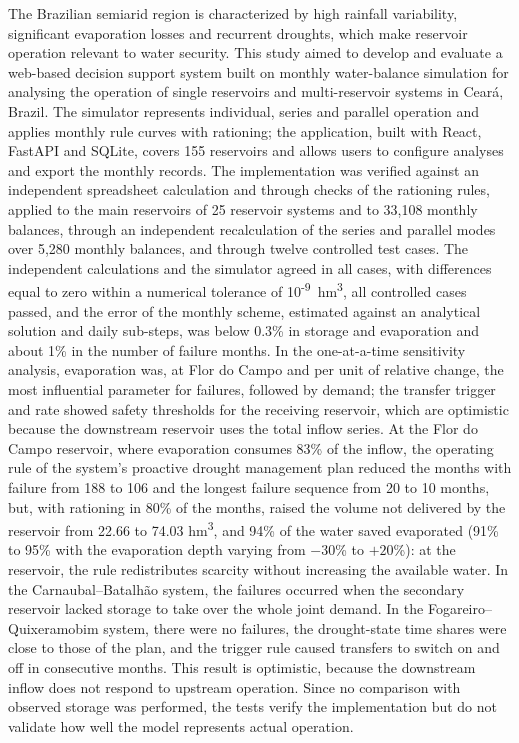 The Brazilian semiarid region is characterized by high rainfall variability, significant evaporation losses and recurrent droughts, which make reservoir operation relevant to water security. This study aimed to develop and evaluate a web-based decision support system built on monthly water-balance simulation for analysing the operation of single reservoirs and multi-reservoir systems in Ceará, Brazil. The simulator represents individual, series and parallel operation and applies monthly rule curves with rationing; the application, built with React, FastAPI and SQLite, covers 155 reservoirs and allows users to configure analyses and export the monthly records. The implementation was verified against an independent spreadsheet calculation and through checks of the rationing rules, applied to the main reservoirs of 25 reservoir systems and to 33,108 monthly balances, through an independent recalculation of the series and parallel modes over 5,280 monthly balances, and through twelve controlled test cases. The independent calculations and the simulator agreed in all cases, with differences equal to zero within a numerical tolerance of 10\textsuperscript{-9}~hm\textsuperscript{3}, all controlled cases passed, and the error of the monthly scheme, estimated against an analytical solution and daily sub-steps, was below 0.3\% in storage and evaporation and about 1\% in the number of failure months. In the one-at-a-time sensitivity analysis, evaporation was, at Flor do Campo and per unit of relative change, the most influential parameter for failures, followed by demand; the transfer trigger and rate showed safety thresholds for the receiving reservoir, which are optimistic because the downstream reservoir uses the total inflow series. At the Flor do Campo reservoir, where evaporation consumes 83\% of the inflow, the operating rule of the system's proactive drought management plan reduced the months with failure from 188 to 106 and the longest failure sequence from 20 to 10 months, but, with rationing in 80\% of the months, raised the volume not delivered by the reservoir from 22.66 to 74.03 hm\textsuperscript{3}, and 94\% of the water saved evaporated (91\% to 95\% with the evaporation depth varying from $-30$\% to $+20$\%): at the reservoir, the rule redistributes scarcity without increasing the available water. In the Carnaubal--Batalhão system, the failures occurred when the secondary reservoir lacked storage to take over the whole joint demand. In the Fogareiro--Quixeramobim system, there were no failures, the drought-state time shares were close to those of the plan, and the trigger rule caused transfers to switch on and off in consecutive months. This result is optimistic, because the downstream inflow does not respond to upstream operation. Since no comparison with observed storage was performed, the tests verify the implementation but do not validate how well the model represents actual operation.

